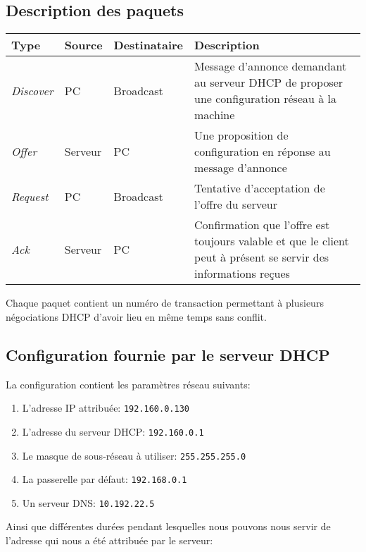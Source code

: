 \documentclass[11pt,a4paper]{article}
\begin{document}
\subsection{Description des paquets}

\begin{tabular}{|l||l|l|p{8.9cm}|}
\hline
	\textbf{Type} & \textbf{Source} & \textbf{Destinataire} & \textbf{Description} \\
\hline
	\textit{Discover} &
	PC & Broadcast &
	Message d'annonce demandant au serveur DHCP de proposer une configuration réseau à la machine \\
\hline
	\textit{Offer} &
	Serveur & PC &
	Une proposition de configuration en réponse au message d'annonce \\
\hline
	\textit{Request} &
	PC & Broadcast &
	Tentative d'acceptation de l'offre du serveur \\
\hline
	\textit{Ack} &
	Serveur & PC &
	Confirmation que l'offre est toujours valable et que le client peut à présent se servir des informations reçues \\
	\hline
\end{tabular}

\vspace{1em}

Chaque paquet contient un numéro de transaction permettant à plusieurs négociations DHCP d'avoir lieu en même temps sans conflit.

\subsection{Configuration fournie par le serveur DHCP}

La configuration contient les paramètres réseau suivants:

\begin{enumerate}
	\item L'adresse IP attribuée: \texttt{192.160.0.130}
	\item L'adresse du serveur DHCP: \texttt{192.160.0.1}
	\item Le masque de sous-réseau à utiliser: \texttt{255.255.255.0}
	\item La passerelle par défaut: \texttt{192.168.0.1}
	\item Un serveur DNS: \texttt{10.192.22.5}
\end{enumerate}

Ainsi que différentes durées pendant lesquelles nous pouvons nous servir de l'adresse qui nous a été attribuée par le serveur:
\end{document}
